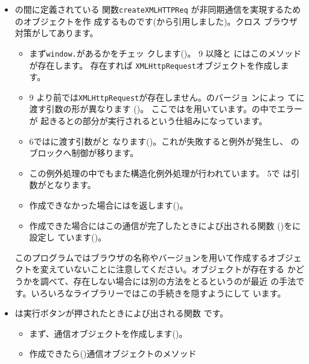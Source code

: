 
\begin{itemize}
 \item {}の間に定義されている
       関数\texttt{createXMLHTTPReq}
       が非同期通信を実現するためのオブジェクトを作
       成するものです(\cite{javascriptHacker}から引用しました)。クロス
       ブラウザ対策がしてあります。
 \begin{itemize}
  \item まず\texttt{window.}があるかをチェッ
	クします()。\IEn{} 9 以降と \Operan にはこのメソッド
	が存在します。
	存在すれば
	\texttt{XMLHttpRequest}オブジェクトを作成します。
  \item \IEn{} 9 より前では\texttt{XMLHttpRequest}が存在しません。\IEn のバージョ
	ンによっ
	てに渡す引数の形が異なります
	()。
	ここではを用いています。の中でエラーが
	起きるとの部分が実行されるという仕組みになっています。
  \item \IEn{} 6ではに渡す引数がと
	なります()。これが失敗すると例外が発生し、
	のブロックへ制御が移ります。
  \item この例外処理の中でもまた構造化例外処理が行われています。\IEn{} 5で
	は引数がとなります。
  \item 作成できなかった場合にはを返します()。
  \item 作成できた場合にはこの通信が完了したときによび出される関数
	()をに設定し
	ています()。
 \end{itemize}
       {このプログラムではブラウザの名称やバージョンを用いて作成するオブジェ
       クトを変えていないことに注意してください。オブジェクトが存在する
       かどうかを調べて、存在しない場合には別の方法をとるというのが最近
       の手法です。いろいろなライブラリーではこの手続きを隠すようにして
       います。}
 \item {}は実行ボタンが押されたときによび出される関数
       です。
\begin{itemize}
 \item まず、通信オブジェクトを作成します()。
 \item 作成できたら()通信オブジェクトのメソッド

\end{itemize}
\end{itemize}
